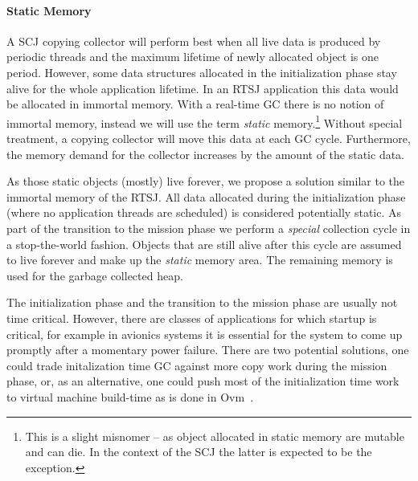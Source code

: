 
\paragraph{Static Memory} \label{sec:static:mem}

A SCJ copying collector will perform best when all live data is
produced by periodic threads and the maximum lifetime of newly
allocated object is one period.  However, some data structures
allocated in the initialization phase stay alive for the whole
application lifetime.  In an RTSJ application this data would be
allocated in immortal memory.  With a real-time GC there is no
notion of {immortal} memory, instead we will use the term
\emph{static} memory.\footnote{This is a slight misnomer -- as
object allocated in static memory are mutable and can die. In the
context of the SCJ the latter is expected to be the exception.}
Without special treatment, a copying collector will move this data
at each GC cycle. Furthermore, the memory demand for the collector
increases by the amount of the static data.

As those static objects (mostly) live {forever}, we propose a solution
similar to the immortal memory of the RTSJ.  All data allocated during the
initialization phase (where no application threads are scheduled) is
considered potentially static. As part of the transition to the mission
phase we perform a \emph{special} collection cycle in a stop-the-world
fashion. Objects that are still alive after this cycle are assumed to live
forever and make up the \emph{static} memory area. The remaining memory is
used for the garbage collected heap.

The initialization phase and the transition to the mission phase are
usually not time critical. However, there are classes of applications for
which startup is critical, for example in avionics systems it is essential
for the system to come up promptly after a momentary power failure. There
are two potential solutions, one could trade initalization time GC against
more copy work during the mission phase, or, as an alternative, one could
push most of the initialization time work to virtual machine build-time
as is done in Ovm~\cite{tecs:06}.

